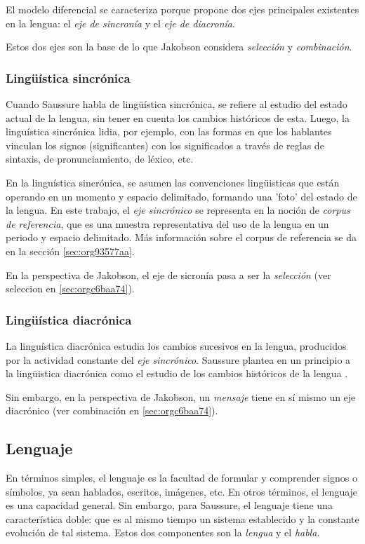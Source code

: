\documentclass[12pt,letterpaper,twoside]{article}
\begin{document}
El modelo diferencial se caracteriza porque propone dos ejes
principales existentes en la lengua: el \emph{eje de sincronía} y el
\emph{eje de diacronía}.\cite{alonso1945curso}

Estos dos ejes son la base de lo que Jakobson considera \emph{selección} y
\emph{combinación}.


\subsubsection{Lingüística sincrónica}
\label{sec:org5580cbd}

Cuando Saussure habla de lingüística sincrónica, se refiere al
estudio del estado actual de la lengua, sin tener en cuenta los
cambios históricos de esta. Luego, la linguística sincrónica lidia,
por ejemplo, con las formas en que los hablantes vinculan los
signos (significantes) con los significados a través de reglas de
sintaxis, de pronunciamiento, de léxico, etc.

En la linguística sincrónica, se asumen las convenciones lingüisticas
que están operando en un momento y espacio delimitado, formando una
'foto' del estado de la lengua. En este trabajo, el \emph{eje sincrónico}
se representa en la noción de \emph{corpus de referencia}, que es una muestra
representativa del uso de la lengua en un periodo y espacio delimitado.
Más información sobre el corpus de referencia se da en la sección \ref{sec:org93577aa}.

En la perspectiva de Jakobson, el eje de sicronía pasa a ser la
\emph{selección} (ver seleccion en \ref{sec:orgc6baa74}).

\subsubsection{Lingüística diacrónica}
\label{sec:orgc815f29}

La linguística diacrónica estudia los cambios sucesivos en la
lengua, producidos por la actividad constante del \emph{eje
sincrónico}. Saussure plantea en un principio a la lingüistica
diacrónica como el estudio de los cambios históricos de la
lengua \cite{alonso1945curso}.


Sin embargo, en la perspectiva de Jakobson, un \emph{mensaje} tiene en
sí mismo un eje diacrónico (ver combinación en \ref{sec:orgc6baa74}).

\subsection{Lenguaje}
\label{sec:org4ea04cb}
En términos simples, el lenguaje es la facultad de formular y
comprender signos o símbolos, ya sean hablados, escritos,
imágenes, etc.  En otros términos, el lenguaje es una capacidad
general. Sin embargo, para Saussure, el lenguaje tiene una
característica doble: que es al mismo tiempo un sistema
establecido y la constante evolución de tal sistema. Estos dos
componentes son la \emph{lengua} y el \emph{habla}.
\end{document}

